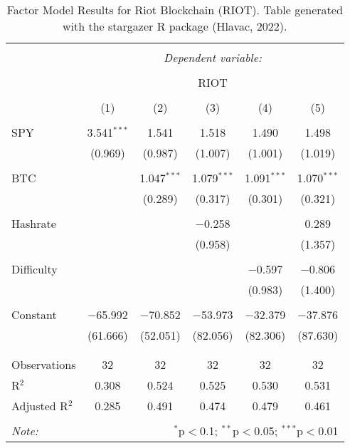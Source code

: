 
\begin{table}[!htbp] \centering 
  \caption{Factor Model Results for Riot Blockchain (RIOT). Table generated with the stargazer R package (Hlavac, 2022).} 
  \label{ModelResults_RIOT} 
\large 
\begin{tabular}{@{\extracolsep{5pt}}lccccc} 
\\[-1.8ex]\hline 
\hline \\[-1.8ex] 
 & \multicolumn{5}{c}{\textit{Dependent variable:}} \\ 
\cline{2-6} 
\\[-1.8ex] & \multicolumn{5}{c}{RIOT} \\ 
\\[-1.8ex] & (1) & (2) & (3) & (4) & (5)\\ 
\hline \\[-1.8ex] 
 SPY & 3.541$^{***}$ & 1.541 & 1.518 & 1.490 & 1.498 \\ 
  & (0.969) & (0.987) & (1.007) & (1.001) & (1.019) \\ 
  & & & & & \\ 
 BTC &  & 1.047$^{***}$ & 1.079$^{***}$ & 1.091$^{***}$ & 1.070$^{***}$ \\ 
  &  & (0.289) & (0.317) & (0.301) & (0.321) \\ 
  & & & & & \\ 
 Hashrate &  &  & $-$0.258 &  & 0.289 \\ 
  &  &  & (0.958) &  & (1.357) \\ 
  & & & & & \\ 
 Difficulty &  &  &  & $-$0.597 & $-$0.806 \\ 
  &  &  &  & (0.983) & (1.400) \\ 
  & & & & & \\ 
 Constant & $-$65.992 & $-$70.852 & $-$53.973 & $-$32.379 & $-$37.876 \\ 
  & (61.666) & (52.051) & (82.056) & (82.306) & (87.630) \\ 
  & & & & & \\ 
\hline \\[-1.8ex] 
Observations & 32 & 32 & 32 & 32 & 32 \\ 
R$^{2}$ & 0.308 & 0.524 & 0.525 & 0.530 & 0.531 \\ 
Adjusted R$^{2}$ & 0.285 & 0.491 & 0.474 & 0.479 & 0.461 \\ 
\hline 
\hline \\[-1.8ex] 
\textit{Note:}  & \multicolumn{5}{r}{$^{*}$p$<$0.1; $^{**}$p$<$0.05; $^{***}$p$<$0.01} \\ 
\end{tabular} 
\end{table} 
